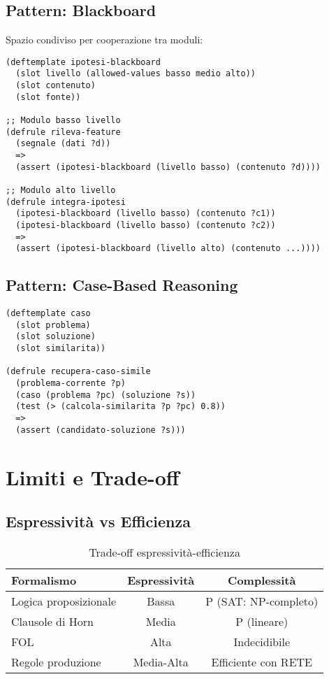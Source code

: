 \subsection{Pattern: Blackboard}

Spazio condiviso per cooperazione tra moduli:

\begin{lstlisting}[language=CLIPS]
(deftemplate ipotesi-blackboard
  (slot livello (allowed-values basso medio alto))
  (slot contenuto)
  (slot fonte))

;; Modulo basso livello
(defrule rileva-feature
  (segnale (dati ?d))
  =>
  (assert (ipotesi-blackboard (livello basso) (contenuto ?d))))

;; Modulo alto livello
(defrule integra-ipotesi
  (ipotesi-blackboard (livello basso) (contenuto ?c1))
  (ipotesi-blackboard (livello basso) (contenuto ?c2))
  =>
  (assert (ipotesi-blackboard (livello alto) (contenuto ...))))
\end{lstlisting}

\subsection{Pattern: Case-Based Reasoning}

\begin{lstlisting}[language=CLIPS]
(deftemplate caso
  (slot problema)
  (slot soluzione)
  (slot similarita))

(defrule recupera-caso-simile
  (problema-corrente ?p)
  (caso (problema ?pc) (soluzione ?s))
  (test (> (calcola-similarita ?p ?pc) 0.8))
  =>
  (assert (candidato-soluzione ?s)))
\end{lstlisting}

\section{Limiti e Trade-off}

\subsection{Espressività vs Efficienza}

\begin{table}[h]
\centering
\begin{tabular}{@{}lcc@{}}
\toprule
\textbf{Formalismo} & \textbf{Espressività} & \textbf{Complessità} \\
\midrule
Logica proposizionale & Bassa & P (SAT: NP-completo) \\
Clausole di Horn & Media & P (lineare) \\
FOL & Alta & Indecidibile \\
Regole produzione & Media-Alta & Efficiente con RETE \\
\bottomrule
\end{tabular}
\caption{Trade-off espressività-efficienza}
\end{table}

